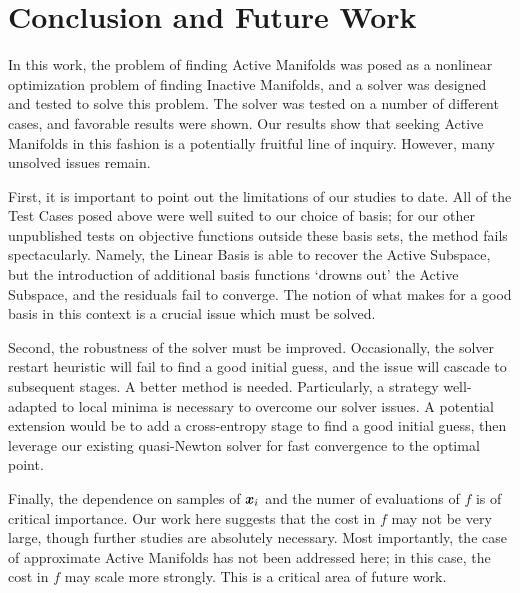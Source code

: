 \documentclass[]{aiaa-tc}%
\begin{document}
\section{Conclusion and Future Work} \label{sec:conclusion}

In this work, the problem of finding Active Manifolds was posed as a nonlinear optimization problem of finding Inactive Manifolds, and a solver was designed and tested to solve this problem. The solver was tested on a number of different cases, and favorable results were shown. Our results show that seeking Active Manifolds in this fashion is a potentially fruitful line of inquiry. However, many unsolved issues remain.

First, it is important to point out the limitations of our studies to date. All of the Test Cases posed above were well suited to our choice of basis; for our other unpublished tests on objective functions outside these basis sets, the method fails spectacularly. Namely, the Linear Basis is able to recover the Active Subspace, but the introduction of additional basis functions `drowns out' the Active Subspace, and the residuals fail to converge. The notion of what makes for a good basis in this context is a crucial issue which must be solved.

Second, the robustness of the solver must be improved. Occasionally, the solver restart heuristic will fail to find a good initial guess, and the issue will cascade to subsequent stages. A better method is needed. Particularly, a strategy well-adapted to local minima is necessary to overcome our solver issues. A potential extension would be to add a cross-entropy stage to find a good initial guess, then leverage our existing quasi-Newton solver for fast convergence to the optimal point.\cite{Rubinstein2005}

Finally, the dependence on samples of $\boldsymbol{x}_i$ and the numer of evaluations of $f$ is of critical importance. Our work here suggests that the cost in $f$ may not be very large, though further studies are absolutely necessary. Most importantly, the case of approximate Active Manifolds has not been addressed here; in this case, the cost in $f$ may scale more strongly. This is a critical area of future work.




\end{document}
